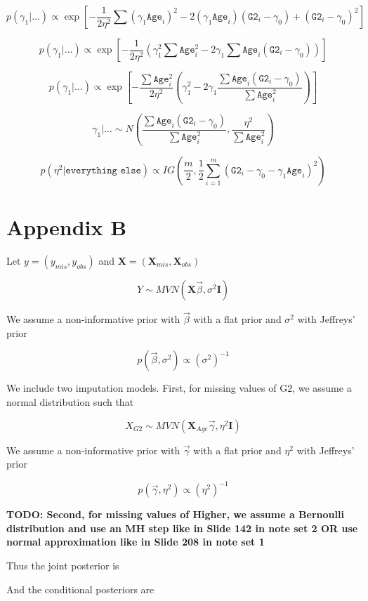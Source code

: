 \documentclass[11pt]{article}
\begin{document}
$$p(\gamma_1 | ...) \propto \exp \left[ -\frac{1}{2\eta^2} \sum (\gamma_1 \texttt{Age}_i)^2 
-2 (\gamma_1 \texttt{Age}_i)(\texttt{G2}_i -\gamma_0 )
+ (\texttt{G2}_i -\gamma_0 )^2 \right]$$

$$p(\gamma_1 | ...) \propto \exp \left[ -\frac{1}{2\eta^2} 
(\gamma_1^2 \sum \texttt{Age}_i^2 
-2 \gamma_1 \sum \texttt{Age}_i(\texttt{G2}_i -\gamma_0 ))\right]$$

$$p(\gamma_1 | ...) \propto \exp \left[ -\frac{\sum\texttt{Age}_i^2}{2\eta^2} 
(\gamma_1^2
-2 \gamma_1 \frac{\sum \texttt{Age}_i(\texttt{G2}_i -\gamma_0 )}{\sum\texttt{Age}_i^2})\right]$$

$$\gamma_1 | ... \sim N\left( 
\frac{\sum \texttt{Age}_i(\texttt{G2}_i -\gamma_0 )}{\sum\texttt{Age}_i^2},
\frac{\eta^2}{\sum\texttt{Age}_i^2} \right)$$

$$p(\eta^2 | \texttt{everything else}) \propto IG \left(
\frac{m}{2},
\frac{1}{2}\sum_{i=1}^m (\texttt{G2}_i - \gamma_0 - \gamma_1\texttt{Age}_i)^2
\right)$$


\newpage
\section{Appendix B}

Let $y = (y_{mis}, y_{obs})$ and $\mathbf{X} = (\mathbf{X}_{mis}, \mathbf{X}_{obs})$

$$Y \sim MVN(\mathbf{X}\vec{\beta}, \sigma^2\mathbf{I})$$

We assume a non-informative prior with $\vec{\beta}$ with a flat prior and $\sigma^2$ with Jeffreys' prior

$$p(\vec{\beta}, \sigma^2) \propto (\sigma^2)^{-1}$$

We include two imputation models. First, for missing values of G2, we assume a normal distribution such that

$$X_{G2} \sim MVN(\mathbf{X}_{Age}\vec{\gamma}, \eta^2\mathbf{I})$$

We assume a non-informative prior with $\vec{\gamma}$ with a flat prior and $\eta^2$ with Jeffreys' prior

$$p(\vec{\gamma}, \eta^2) \propto (\eta^2)^{-1}$$

\textbf{TODO: Second, for missing values of Higher, we assume a Bernoulli distribution and use an MH step like in Slide 142 in note set 2 OR use normal approximation like in Slide 208 in note set 1}

Thus the joint posterior is

And the conditional posteriors are
\end{document}
